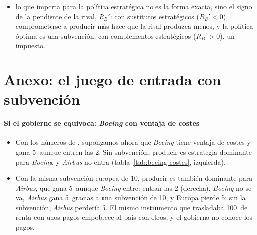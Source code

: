 \documentclass[11pt]{article}
\begin{document}
\begin{itemize}
\begin{itemize}
  \item lo que importa para la política estratégica no es la forma exacta, sino el signo de la pendiente de la rival, $R_B'$: con sustitutos estratégicos ($R_B'<0$), comprometerse a producir más hace que la rival produzca menos, y la política óptima es una subvención; con complementos estratégicos ($R_B'>0$), un impuesto.
  \end{itemize}
\end{itemize}

\section{Anexo: el juego de entrada con subvención}\label{anexo:juego-entrada}

\paragraph{Si el gobierno se equivoca: \emph{Boeing} con ventaja de costes}

\begin{itemize}
\item Con los números de \textcite[136]{Krugman1987Passe}, supongamos ahora que \emph{Boeing} tiene ventaja de costes y gana 5~aunque entren las 2. Sin subvención, producir es estrategia dominante para \emph{Boeing}, y \emph{Airbus} no entra (tabla~\ref{tab:boeing-costes}, izquierda).
\item Con la misma subvención europea de 10, producir es también dominante para \emph{Airbus}, que gana 5~aunque \emph{Boeing} entre: entran las 2 (derecha). \emph{Boeing} no se va, \emph{Airbus} gana 5~gracias a una subvención de 10, y Europa pierde 5: sin la subvención, \emph{Airbus} perdería 5. El mismo instrumento que trasladaba 100~de renta con unos pagos empobrece al país con otros, y el gobierno no conoce los pagos.\findemo
\end{itemize}
\end{document}
